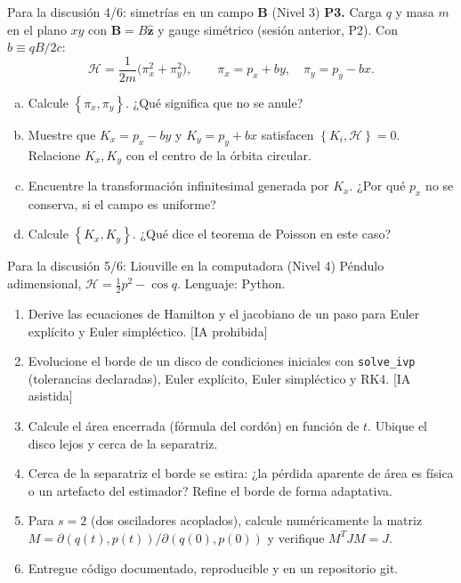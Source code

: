\documentclass[spanish]{beamer}
\newcommand{\Ham}{\mathcal{H}}               %
\newcommand{\pb}[2]{\left\{#1,#2\right\}}    %
\begin{document}
\begin{frame}{Para la discusión 4/6: simetrías en un campo $\mathbf B$ (Nivel 3)}
\textbf{P3.} Carga $q$ y masa $m$ en el plano $xy$ con $\mathbf B=B\hat{\mathbf z}$
y gauge simétrico (sesión anterior, P2). Con $b\equiv qB/2c$:
\[
  \Ham=\frac{1}{2m}\big(\pi_x^2+\pi_y^2\big),\qquad
  \pi_x=p_x+by,\quad\pi_y=p_y-bx .
\]
\begin{enumerate}[(a)]
  \item Calcule $\pb{\pi_x}{\pi_y}$. ¿Qué significa que no se anule?
  \item Muestre que $K_x=p_x-by$ y $K_y=p_y+bx$ satisfacen $\pb{K_i}{\Ham}=0$.
        Relacione $K_x,K_y$ con el centro de la órbita circular.
  \item Encuentre la transformación infinitesimal generada por $K_x$. ¿Por qué $p_x$
        no se conserva, si el campo es uniforme?
  \item Calcule $\pb{K_x}{K_y}$. ¿Qué dice el teorema de Poisson en este caso?
\end{enumerate}
\end{frame}

\begin{frame}{Para la discusión 5/6: Liouville en la computadora (Nivel 4)}
\small
Péndulo adimensional, $\Ham=\tfrac12p^2-\cos q$. Lenguaje: Python.
\begin{enumerate}[<+->]
  \item Derive las ecuaciones de Hamilton y el jacobiano de un paso para Euler explícito
        y Euler simpléctico. \hfill{\scriptsize[IA prohibida]}
  \item Evolucione el borde de un disco de condiciones iniciales con \texttt{solve\_ivp}
        (tolerancias declaradas), Euler explícito, Euler simpléctico y RK4.
        \hfill{\scriptsize[IA asistida]}
  \item Calcule el área encerrada (fórmula del cordón) en función de $t$. Ubique el disco
        lejos y cerca de la separatriz.
  \item Cerca de la separatriz el borde se estira: ¿la pérdida aparente de área es física o
        un artefacto del estimador? Refine el borde de forma adaptativa.
  \item Para $s=2$ (dos osciladores acoplados), calcule numéricamente la matriz
        $M=\partial(q(t),p(t))/\partial(q(0),p(0))$ y verifique $M^{T}JM=J$.
  \item Entregue código documentado, reproducible y en un repositorio git.
\end{enumerate}
\end{frame}
\end{document}

